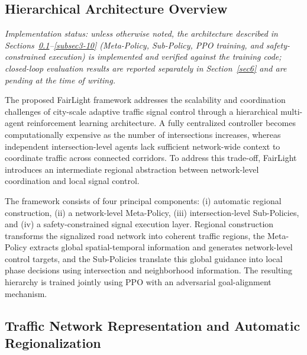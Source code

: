 \documentclass[3p,times]{elsarticle}
\theoremstyle{plain}
\theoremstyle{definition}
\begin{document}

\subsection{Hierarchical Architecture Overview}\label{subsec3-4}

\textit{Implementation status: unless otherwise noted, the
architecture described in Sections~\ref{subsec3-4}--\ref{subsec3-10}
(Meta-Policy, Sub-Policy, PPO training, and safety-constrained
execution) is implemented and verified against the training code;
closed-loop evaluation results are reported separately in
Section~\ref{sec6} and are pending at the time of writing.}

The proposed FairLight framework addresses the scalability and
coordination challenges of city-scale adaptive traffic signal control
through a hierarchical multi-agent reinforcement learning
architecture. A fully centralized controller becomes computationally
expensive as the number of intersections increases, whereas
independent intersection-level agents lack sufficient network-wide
context to coordinate traffic across connected corridors. To address
this trade-off, FairLight introduces an intermediate regional
abstraction between network-level coordination and local signal
control.

The framework consists of four principal components: (i)
automatic regional construction, (ii) a network-level Meta-Policy,
(iii) intersection-level Sub-Policies, and (iv) a safety-constrained
signal execution layer. Regional construction transforms the
signalized road network into coherent traffic regions, the Meta-Policy
extracts global spatial-temporal information and generates
network-level control targets, and the Sub-Policies translate this
global guidance into local phase decisions using intersection and
neighborhood information. The resulting hierarchy is trained jointly
using PPO with an adversarial goal-alignment mechanism.


\subsection{Traffic Network Representation and Automatic
Regionalization}\label{subsec3-5}
\end{document}
